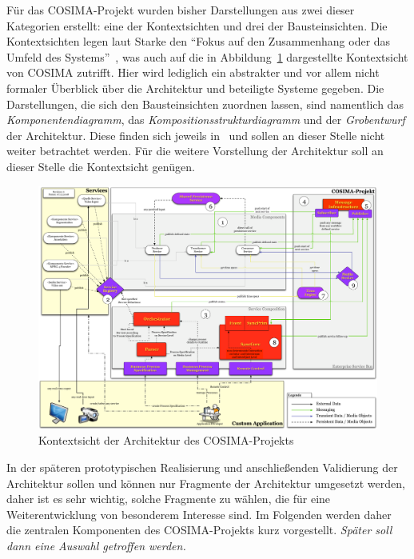   Für das COSIMA-Projekt wurden bisher Darstellungen aus zwei dieser Kategorien erstellt: eine der Kontextsichten und drei der Bausteinsichten. Die Kontextsichten legen laut Starke den "`Fokus auf den Zusammenhang oder das Umfeld des Systems"'~\citep[S. 87]{effektive_software_architekturen}, was auch auf die in Abbildung~\ref{fig:Kontextsicht_Architektur_COSIMA} dargestellte Kontextsicht von COSIMA zutrifft. Hier wird lediglich ein abstrakter und vor allem nicht formaler Überblick über die Architektur und beteiligte Systeme gegeben. Die Darstellungen, die sich den Bausteinsichten zuordnen lassen, sind namentlich das \emph{Komponentendiagramm}, das \emph{Kompositionsstrukturdiagramm} und der \emph{Grobentwurf} der Architektur. Diese finden sich jeweils in~\citep{bericht} und sollen an dieser Stelle nicht weiter betrachtet werden. Für die weitere Vorstellung der Architektur soll an dieser Stelle die Kontextsicht genügen.

  \begin{figure}
    \centering
    \includegraphics[width=\textwidth]{images/Kontextsicht_Architektur_COSIMA}
    \caption{Kontextsicht der Architektur des COSIMA-Projekts}
    \label{fig:Kontextsicht_Architektur_COSIMA}
  \end{figure}

  In der späteren prototypischen Realisierung und anschließenden Validierung der Architektur sollen und können nur Fragmente der Architektur umgesetzt werden, daher ist es sehr wichtig, solche Fragmente zu wählen, die für eine Weiterentwicklung von besonderem Interesse sind. Im Folgenden werden daher die zentralen Komponenten des COSIMA-Projekts kurz vorgestellt. \emph{Später soll dann eine Auswahl getroffen werden.}

